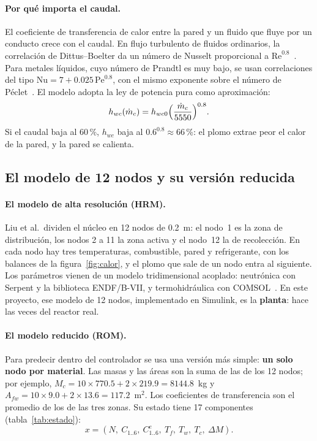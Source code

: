 \paragraph{Por qué importa el caudal.} El coeficiente de transferencia de calor entre la
pared y un fluido que fluye por un conducto crece con el caudal. En flujo turbulento de
fluidos ordinarios, la correlación de Dittus--Boelter da un número de Nusselt proporcional a
$\mathrm{Re}^{0.8}$~\cite{incropera2007}. Para metales líquidos, cuyo número de Prandtl es muy
bajo, se usan correlaciones del tipo $\mathrm{Nu}=7+0.025\,\mathrm{Pe}^{0.8}$, con el mismo
exponente sobre el número de Péclet~\cite{todreas2011}. El modelo adopta la ley de potencia
pura como aproximación:
\[
h_{wc}(\dot m_c)=h_{wc0}\Big(\frac{\dot m_c}{5550}\Big)^{0.8}.
\]
Si el caudal baja al 60\,\%, $h_{wc}$ baja al $0.6^{0.8}\approx66$\,\%: el plomo extrae peor el
calor de la pared, y la pared se calienta.

\subsection{El modelo de 12 nodos y su versión reducida}
\paragraph{El modelo de alta resolución (HRM).} Liu et al.\ dividen el núcleo en 12 nodos de
0.2~m: el nodo~1 es la zona de distribución, los nodos 2 a 11 la zona activa y el nodo~12 la
de recolección. En cada nodo hay tres temperaturas, combustible, pared y refrigerante, con
los balances de la figura~\ref{fig:calor}, y el plomo que sale de un nodo entra al siguiente.
Los parámetros vienen de un modelo tridimensional acoplado: neutrónica con Serpent y la
biblioteca ENDF/B-VII, y termohidráulica con COMSOL~\cite{liu2021}. En este proyecto, ese
modelo de 12 nodos, implementado en Simulink, es la \textbf{planta}: hace las veces del
reactor real.

\paragraph{El modelo reducido (ROM).} Para predecir dentro del controlador se usa una versión
más simple: \textbf{un solo nodo por material}. Las masas y las áreas son la suma de las de los
12 nodos; por ejemplo, $M_c=10\times770.5+2\times219.9=8144.8$~kg y
$A_{fw}=10\times9.0+2\times13.6=117.2$~m$^2$. Los coeficientes de transferencia son el
promedio de los de las tres zonas. Su estado tiene 17 componentes (tabla~\ref{tab:estado}):
\[
x=(N,\ C_{1..6},\ C^e_{1..6},\ T_f,\ T_w,\ T_c,\ \Delta M).
\]

